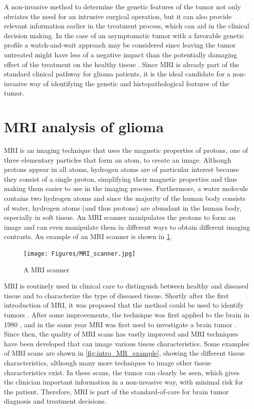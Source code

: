 A non-invasive method to determine the genetic features of the \gls{tumor} not only obviates the need for an intrusive surgical operation, but it can also provide relevant information earlier in the treatment process, which can aid in the clinical decision making.
In the case of an asymptomatic \gls{tumor} with a favorable genetic profile a watch-and-wait approach may be considered since leaving the \gls{tumor} untreated might have less of a negative impact than the potentially damaging effect of the treatment on the healthy tissue \autocite{vandenbent2012lggtreatment, welle2017EANO}.
Since \gls{MRI} is already part of the standard clinical pathway for glioma patients, it is the ideal candidate for a non-invasive way of identifying the genetic and histopathological features of the \gls{tumor}.

\section{MRI analysis of glioma}

\Acrfull{MRI} is an imaging technique that uses the magnetic properties of protons, one of three elementary particles that form an atom, to create an image.
Although protons appear in all atoms, hydrogen atoms are of particular interest because they consist of a single proton, simplifying their magnetic properties and thus making them easier to use in the imaging process.
Furthermore, a water molecule contains two hydrogen atoms and since the majority of the human body consists of water, hydrogen atoms (and thus protons) are abundant in the human body, especially in soft tissue.
An \gls{MRI} scanner manipulates the protons to form an image and can even manipulate them in different ways to obtain different imaging contrasts.
An example of an \gls{MRI} scanner is shown in \cref{fig:intro_MR_machine}.


\begin{figure}[hbt]
    \texttt{[image: Figures/MRI\_scanner.jpg]}
    \caption{A \acrfull{MRI} scanner}\label{fig:intro_MR_machine}
\end{figure}

\gls{MRI} is routinely used in clinical care to distinguish between healthy and diseased tissue and to characterize the type of diseased tissue.
Shortly after the first introduction of \gls{MRI}, it was proposed that the method could be used to identify \glspl{tumor} \autocite{damadian1971tumor}.
After some improvements, the technique was first applied to the brain in 1980 \autocite{holland1980brain}, and in the same year MRI was first used to investigate a brain \gls{tumor} \autocite{hawkes1980NMRbrain}.
Since then, the quality of \gls{MRI} scans has vastly improved and \gls{MRI} techniques have been developed that can image various tissue characteristics.
Some examples of \gls{MRI} scans are shown in \cref{fig:intro_MR_example}, showing the different tissue characteristics, although many more techniques to image other tissue characteristics exist.
In these scans, the \gls{tumor} can clearly be seen, which gives the clinician important information in a non-invasive way, with minimal risk for the patient.
Therefore, \gls{MRI} is part of the standard-of-care for brain \gls{tumor} diagnosis and treatment decisions.

